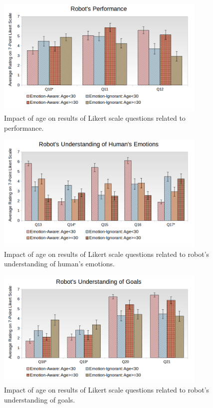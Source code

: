 \documentclass[12pt]{report}
\begin{document}
\begin{figure}[!h]
\centering
\includegraphics[width=0.9\textwidth]{figure/Age-Performance.png}
\caption{\fontsize{10pt}{10pt}\selectfont Impact of age on results of Likert
scale questions related to performance.}
\label{fig:age-performance}
\vspace*{15mm}
\end{figure}

\begin{figure}[!h]
\centering
\includegraphics[width=0.9\textwidth]{figure/Age-Emotions.png}
\caption{\fontsize{10pt}{10pt}\selectfont Impact of age on results of Likert
scale questions related to robot's understanding of human's emotions.}
\label{fig:age-emotions}
\vspace*{15mm}
\end{figure}

\begin{figure}[!h]
\centering
\includegraphics[width=0.9\textwidth]{figure/Age-Goals.png}
\caption{\fontsize{10pt}{10pt}\selectfont Impact of age on results of Likert
scale questions related to robot's understanding of goals.}
\label{fig:age-goals}
\vspace*{10mm}
\end{figure}
\end{document}
